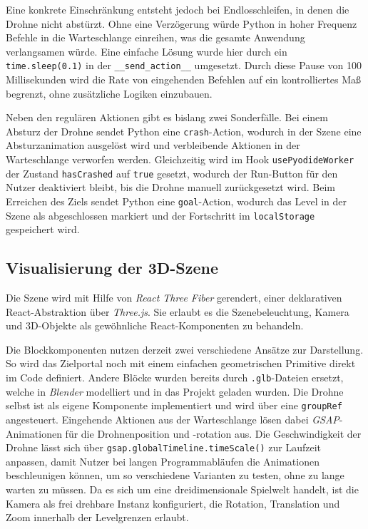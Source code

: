 \documentclass[a4paper,12pt]{article}
\begin{document}
	Eine konkrete Einschränkung entsteht jedoch bei Endlosschleifen, in denen die Drohne 
	nicht abstürzt. Ohne eine Verzögerung würde Python in hoher Frequenz Befehle in die 
	Warteschlange einreihen, was die gesamte Anwendung verlangsamen würde. Eine einfache 
	Lösung wurde hier durch ein \texttt{time.sleep(0.1)} in der 
	\texttt{\_\_send\_action\_\_} umgesetzt. Durch diese Pause von 100 Millisekunden 
	wird die Rate von eingehenden Befehlen auf ein kontrolliertes Maß begrenzt, ohne 
	zusätzliche Logiken einzubauen.

	Neben den regulären Aktionen gibt es bislang zwei Sonderfälle. Bei einem Absturz der Drohne 
	sendet Python eine \texttt{crash}-Action, wodurch in der Szene eine Absturzanimation 
	ausgelöst wird und verbleibende Aktionen in der Warteschlange verworfen werden. 
	Gleichzeitig wird im Hook \texttt{usePyodideWorker} der Zustand \texttt{hasCrashed} auf 
	\texttt{true} gesetzt, wodurch der Run-Button für den Nutzer deaktiviert bleibt, bis die 
	Drohne manuell zurückgesetzt wird. Beim Erreichen des Ziels sendet Python eine 
	\texttt{goal}-Action, wodurch das Level in der Szene als abgeschlossen markiert 
	und der Fortschritt im \texttt{localStorage} gespeichert wird. 

	\subsection{Visualisierung der 3D-Szene}
	Die Szene wird mit Hilfe von \textit{React Three Fiber} gerendert, einer deklarativen 
	React-Abstraktion über \textit{Three.js}. Sie erlaubt es die Szenebeleuchtung, Kamera 
	und 3D-Objekte als gewöhnliche React-Komponenten zu behandeln. 

	Die Blockkomponenten nutzen derzeit zwei verschiedene Ansätze zur Darstellung. So wird 
	das Zielportal noch mit einem einfachen geometrischen Primitive direkt im Code definiert. 
	Andere Blöcke wurden bereits durch \texttt{.glb}-Dateien ersetzt, welche in \textit{Blender} 
	modelliert und in das Projekt geladen wurden. Die Drohne selbst ist als eigene Komponente 
	implementiert und wird über eine \texttt{groupRef} angesteuert. Eingehende Aktionen aus 
	der Warteschlange lösen dabei \textit{GSAP}-Animationen für die Drohnenposition und -rotation 
	aus. Die Geschwindigkeit der Drohne lässt sich über \texttt{gsap.globalTimeline.timeScale()} 
	zur Laufzeit anpassen, damit Nutzer bei langen Programmabläufen die Animationen beschleunigen 
	können, um so verschiedene Varianten zu testen, ohne zu lange warten zu müssen. Da es sich 
	um eine dreidimensionale Spielwelt handelt, ist die Kamera als frei drehbare Instanz 
	konfiguriert, die Rotation, Translation und Zoom innerhalb der Levelgrenzen erlaubt. 
\end{document}
